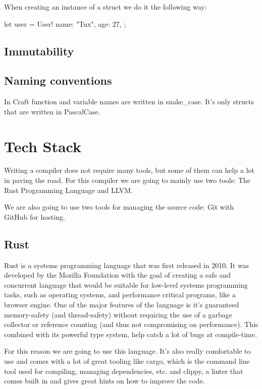 ﻿\documentclass[10pt,a4paper,twocolumn,twoside]{article}
\begin{document}
When creating an instance of a struct we do it the following way:

\begin{code}
    let user = User!{
        name: "Tux",
        age: 27,
    };
\end{code}

\subsection{Immutability}

\subsection{Naming conventions}
In Craft function and variable names are written in snake\_case. It's 
only structs that are written in PascalCase.

\section{Tech Stack}

Writing a compiler does not require many tools, but some of them can help a lot
in paving the road. For this compiler we are going to mainly use two tools: 
The Rust Programming Language and LLVM.

We are also going to use two tools for managing the source code: Git with GitHub
for hosting.

\subsection{Rust}
Rust is a systems programming language that was first released in 2010. It was
developed by the Mozilla Foundation with the goal of creating a safe and
concurrent language that would be suitable for low-level systems programming
tasks, such as operating systems, and performance critical programs, like a
browser engine. One of the major features of the language is it's guaranteed
memory-safety (and thread-safety) without requiring the use of a garbage
collector or reference counting (and thus not compromising on performance).
This combined with its powerful type system, help catch a lot of bugs at 
compile-time.

For this reason we are going to use this language. It's also really comfortable
to use and comes with a lot of great tooling like cargo, which is the command 
line tool used for compiling, managing dependencies, etc. and clippy, a linter
that comes built in and gives great hints on how to improve the code.
\end{document}
